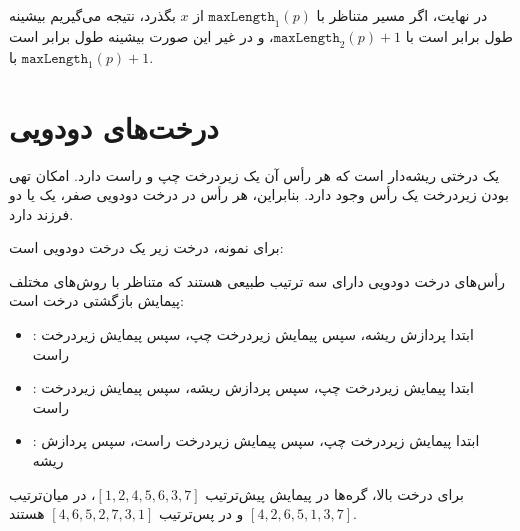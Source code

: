 در نهایت، اگر مسیر متناظر با
$\texttt{maxLength}_1(p)$ از $x$ بگذرد،
نتیجه می‌گیریم بیشینه طول برابر است با
$\texttt{maxLength}_2(p)+1$،
و در غیر این صورت بیشینه طول برابر است با
$\texttt{maxLength}_1(p)+1$.


\section{درخت‌های دودویی}


\begin{samepage}
یک  درختی ریشه‌دار است
که هر رأس آن یک زیردرخت چپ و راست دارد.
امکان تهی بودن زیردرخت یک رأس وجود دارد.
بنابراین، هر رأس در درخت دودویی
صفر، یک یا دو فرزند دارد.

برای نمونه، درخت زیر یک درخت دودویی است:
\begin{center}
\end{center}
\end{samepage}


رأس‌های درخت دودویی دارای سه ترتیب طبیعی هستند
که متناظر با روش‌های مختلف پیمایش بازگشتی
درخت است:

\begin{itemize}
\item {}: ابتدا پردازش ریشه،
سپس پیمایش زیردرخت چپ، سپس پیمایش زیردرخت راست
\item {}: ابتدا پیمایش زیردرخت چپ،
سپس پردازش ریشه، سپس پیمایش زیردرخت راست
\item {}: ابتدا پیمایش زیردرخت چپ،
سپس پیمایش زیردرخت راست، سپس پردازش ریشه
\end{itemize}

برای درخت بالا، گره‌ها در
پیمایش پیش‌ترتیب
$[1,2,4,5,6,3,7]$،
در میان‌ترتیب $[4,2,6,5,1,3,7]$
و در پس‌ترتیب $[4,6,5,2,7,3,1]$ هستند.

